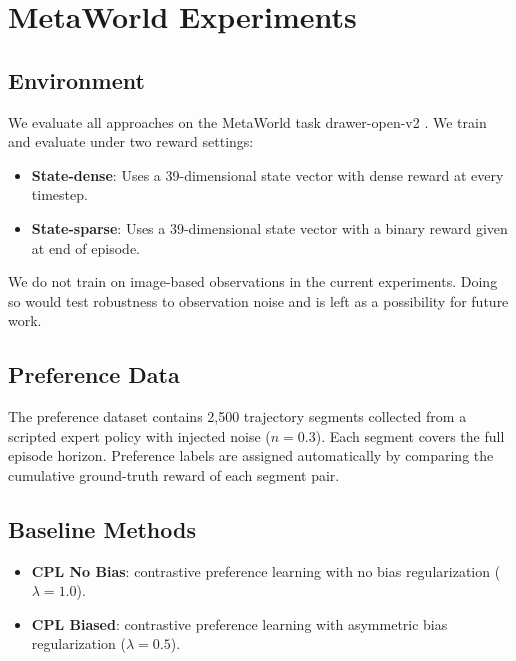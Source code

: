 \documentclass[11pt]{article}
\begin{document}
\section{MetaWorld Experiments}

\subsection{Environment}

We evaluate all approaches on the MetaWorld task drawer-open-v2 \cite{yu2019metaworld}. We train and evaluate under two reward settings:

\begin{itemize}
    \item \textbf{State-dense}: Uses a 39-dimensional state vector with dense reward at every timestep.
    \item \textbf{State-sparse}: Uses a 39-dimensional state vector with a binary reward given at end of episode.
\end{itemize}

We do not train on image-based observations in the current experiments. Doing so would test robustness to observation noise and is left as a possibility for future work.

\subsection{Preference Data}

The preference dataset contains 2,500 trajectory segments collected from a scripted expert policy with injected noise ($n{=}0.3$). Each segment covers the full episode horizon. Preference labels are assigned automatically by comparing the cumulative ground-truth reward of each segment pair.

\subsection{Baseline Methods}


\begin{itemize}
    \item \textbf{CPL No Bias}: contrastive preference learning with no bias regularization ($\lambda = 1.0$).
    \item \textbf{CPL Biased}: contrastive preference learning with asymmetric bias regularization ($\lambda = 0.5$). %

\end{itemize}
\end{document}
